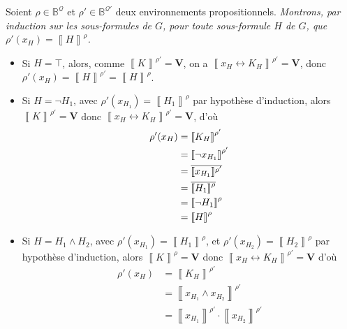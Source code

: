 \begin{prv}
	\begin{prvk}
		Soient $\rho \in \mathds{B}^{\mathcal{Q}}$\/ et $\rho' \in \mathds{B}^{\mathcal{Q}'}$\/ deux environnements propositionnels.
		\textit{Montrons, par induction sur les sous-formules de $G$, pour toute sous-formule $H$\/ de $G$, que $\rho'(x_H) = \left\llbracket H \right\rrbracket^\rho$.}
		\begin{itemize}
			\item Si $H = \top$, alors, comme $\left\llbracket K \right\rrbracket^{\rho'} = \mathbf{V}$, on a $\left\llbracket x_H \leftrightarrow K_H \right\rrbracket^{\rho'} = \mathbf{V}$, donc $\rho'(x_H) = \left\llbracket H \right\rrbracket^{\rho'} = \left\llbracket H \right\rrbracket^\rho$.
			\item Si $H = \lnot H_1$, avec $\rho'(x_{H_1}) = \left\llbracket H_1 \right\rrbracket^\rho$\/ par hypothèse d'induction, alors $\left\llbracket K \right\rrbracket^{\rho'} = \mathbf{V}$\/ donc $\left\llbracket x_H \leftrightarrow K_H \right\rrbracket^{\rho'} = \mathbf{V}$, d'où
				\begin{align*}
					\rho'(x_H) &= \left\llbracket K_H \right\rrbracket^{\rho'}\\
					&= \left\llbracket \lnot x_{H_1} \right\rrbracket^{\rho'} \\
					&= \overline{\left\llbracket x_{H_1} \right\rrbracket^{\smash{\substack{~\\[1mm]\rho'}}}} \\
					&= \overline{\left\llbracket H_1 \right\rrbracket^{\smash{\substack{~\\\rho}}}} \\
					&= \left\llbracket \lnot H_1 \right\rrbracket^{\rho} \\
					&= \left\llbracket H \right\rrbracket^\rho \\
				\end{align*}
			\item Si $H = H_1 \land H_2$, avec $\rho'(x_{H_1}) = \left\llbracket H_1 \right\rrbracket^\rho$, et $\rho'(x_{H_2}) = \left\llbracket H_2 \right\rrbracket^\rho$\/ par hypothèse d'induction, alors $\left\llbracket K \right\rrbracket^\rho = \mathbf{V}$\/ donc $\left\llbracket x_H \leftrightarrow K_H \right\rrbracket^{\rho'} = \mathbf{V}$\/ d'où 
				\begin{align*}
					\rho'(x_H) &= \left\llbracket K_H \right\rrbracket^{\rho'} \\
					&= \left\llbracket x_{H_1} \land x_{H_2} \right\rrbracket^{\rho'} \\
					&= \left\llbracket x_{H_1} \right\rrbracket^{\rho'}\cdot \left\llbracket x_{H_2} \right\rrbracket^{\rho'} \\

\end{align*}
\end{itemize}
\end{prvk}
\end{prv}
